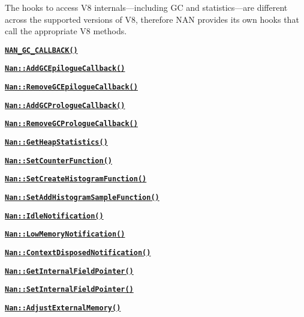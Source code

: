The hooks to access V8 internals—including GC and statistics—are different across the supported versions of V8, therefore N\+AN provides its own hooks that call the appropriate V8 methods.


\begin{DoxyItemize}
\item \href{#api_nan_gc_callback}{\tt {\bfseries {\ttfamily N\+A\+N\+\_\+\+G\+C\+\_\+\+C\+A\+L\+L\+B\+A\+C\+K()}}}
\item \href{#api_nan_add_gc_epilogue_callback}{\tt {\bfseries {\ttfamily Nan\+::\+Add\+G\+C\+Epilogue\+Callback()}}}
\item \href{#api_nan_remove_gc_epilogue_callback}{\tt {\bfseries {\ttfamily Nan\+::\+Remove\+G\+C\+Epilogue\+Callback()}}}
\item \href{#api_nan_add_gc_prologue_callback}{\tt {\bfseries {\ttfamily Nan\+::\+Add\+G\+C\+Prologue\+Callback()}}}
\item \href{#api_nan_remove_gc_prologue_callback}{\tt {\bfseries {\ttfamily Nan\+::\+Remove\+G\+C\+Prologue\+Callback()}}}
\item \href{#api_nan_get_heap_statistics}{\tt {\bfseries {\ttfamily Nan\+::\+Get\+Heap\+Statistics()}}}
\item \href{#api_nan_set_counter_function}{\tt {\bfseries {\ttfamily Nan\+::\+Set\+Counter\+Function()}}}
\item \href{#api_nan_set_create_histogram_function}{\tt {\bfseries {\ttfamily Nan\+::\+Set\+Create\+Histogram\+Function()}}}
\item \href{#api_nan_set_add_histogram_sample_function}{\tt {\bfseries {\ttfamily Nan\+::\+Set\+Add\+Histogram\+Sample\+Function()}}}
\item \href{#api_nan_idle_notification}{\tt {\bfseries {\ttfamily Nan\+::\+Idle\+Notification()}}}
\item \href{#api_nan_low_memory_notification}{\tt {\bfseries {\ttfamily Nan\+::\+Low\+Memory\+Notification()}}}
\item \href{#api_nan_context_disposed_notification}{\tt {\bfseries {\ttfamily Nan\+::\+Context\+Disposed\+Notification()}}}
\item \href{#api_nan_get_internal_field_pointer}{\tt {\bfseries {\ttfamily Nan\+::\+Get\+Internal\+Field\+Pointer()}}}
\item \href{#api_nan_set_internal_field_pointer}{\tt {\bfseries {\ttfamily Nan\+::\+Set\+Internal\+Field\+Pointer()}}}
\item \href{#api_nan_adjust_external_memory}{\tt {\bfseries {\ttfamily Nan\+::\+Adjust\+External\+Memory()}}}
\end{DoxyItemize}

